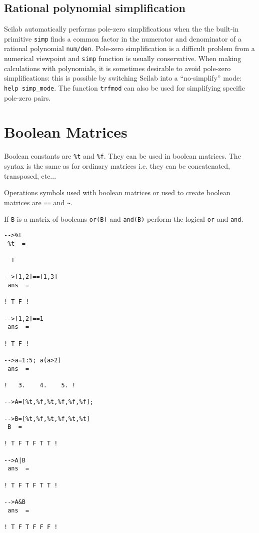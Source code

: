 \subsection{Rational polynomial simplification}
Scilab automatically performs pole-zero simplifications when the 
the built-in primitive {\tt simp} finds a common factor in the
numerator and denominator of a rational polynomial {\tt num/den}.
Pole-zero simplification is a difficult problem from a
numerical viewpoint and {\tt simp} function is usually conservative.
When making calculations with polynomials, it is sometimes desirable
to avoid pole-zero simplifications: this is possible by switching
Scilab into a ``no-simplify'' mode: \verb!help simp_mode!. The
function {\tt trfmod} can also be used for simplifying specific
pole-zero pairs.


\section{Boolean Matrices}

Boolean constants are {\tt \%t} and {\tt \%f}. They can be used in
boolean matrices. The syntax is the same as for ordinary matrices i.e.
they can be concatenated, transposed, etc...

Operations symbols used with boolean matrices or used to create
boolean matrices are {\tt ==} and \verb!~!. 

If {\tt B} is a matrix of booleans {\tt or(B)} and {\tt and(B)} 
perform the logical {\tt or} and {\tt and}.
\begin{verbatim}
-->%t
 %t  =
 
  T  
 
-->[1,2]==[1,3]
 ans  =
 
! T F !
 
-->[1,2]==1
 ans  =
 
! T F !
 
-->a=1:5; a(a>2)
 ans  =
 
!   3.    4.    5. !

-->A=[%t,%f,%t,%f,%f,%f];   
 
-->B=[%t,%f,%t,%f,%t,%t]
 B  =
 
! T F T F T T !
 
-->A|B
 ans  =
 
! T F T F T T !

-->A&B
 ans  =
 
! T F T F F F !
 
\end{verbatim} 

